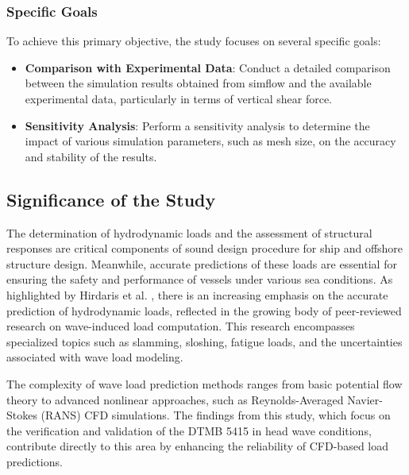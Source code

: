 \documentclass[12pt]{article} %
\begin{document}
\subsubsection{Specific Goals}
To achieve this primary objective, the study focuses on several specific goals:
\begin{itemize}
    \item \textbf{Comparison with Experimental Data}: Conduct a detailed comparison between the 
    simulation results obtained from simflow and the available experimental data, particularly 
    in terms of vertical shear force.
    \item \textbf{Sensitivity Analysis}: Perform a sensitivity analysis to determine the impact 
    of various simulation parameters, such as mesh size, on the accuracy and stability of the results.
\end{itemize}

\subsection{Significance of the Study}
The determination of hydrodynamic loads and the assessment of structural responses are critical 
components of sound design procedure for ship and offshore structure design\cite{offshorehydrodynamics}. Meanwhile, accurate predictions of these 
loads are essential for ensuring the safety and performance of vessels under various sea conditions. 
As highlighted by Hirdaris et al. \cite{Hirdaris2014}, there is an increasing emphasis on the accurate 
prediction of hydrodynamic loads, reflected in the growing body of peer-reviewed research on wave-induced 
load computation. This research encompasses specialized topics such as slamming, sloshing, fatigue loads, 
and the uncertainties associated with wave load modeling.

The complexity of wave load prediction methods ranges from basic potential flow theory to advanced 
nonlinear approaches, such as Reynolds-Averaged Navier-Stokes (RANS) CFD simulations. The findings 
from this study, which focus on the verification and validation of the DTMB 5415 in head wave conditions, 
contribute directly to this area by enhancing the reliability of CFD-based load predictions.
\end{document}
